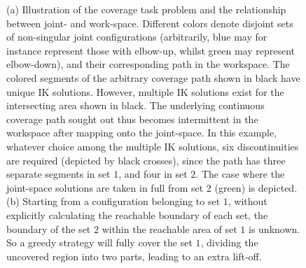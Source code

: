 \documentclass[journal]{IEEEtran}
\begin{document}
\begin{figure}[t]
\centering
{}
\caption{(a) Illustration of the coverage task problem and the relationship between joint- and work-space. 
Different colors denote disjoint sets of non-singular 
joint configurations (arbitrarily, blue may for instance represent those with 
elbow-up, whilst green may represent elbow-down), and their corresponding path in the workspace. 
The colored segments of the arbitrary coverage path shown in black have unique IK solutions. However, multiple IK solutions exist for the intersecting area shown in black.
The underlying continuous coverage path sought out thus becomes intermittent in the workspace after mapping onto the joint-space.
In this example, whatever choice among the multiple IK solutions, six discontinuities are required 
(depicted by black crosses), since the path has three separate segments in set $1$, and four in set $2$. 
The case where the joint-space solutions are taken in full from set 2 (green) is depicted.
(b) Starting from a configuration belonging to set $1$, without explicitly calculating the reachable boundary of each set, the boundary of the set $2$ within the reachable area of set $1$ is unknown. So a greedy strategy will fully cover the set $1$, dividing the uncovered region into two parts, leading to an extra lift-off. 
}
\end{figure}
\end{document}
